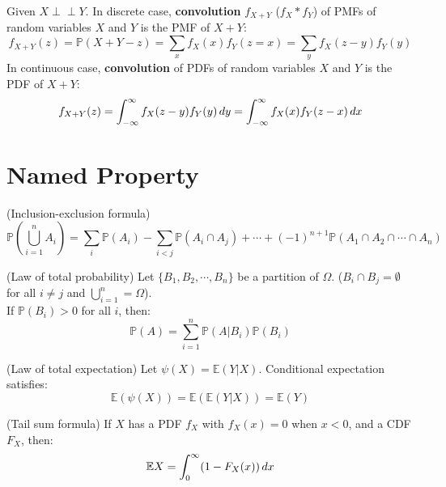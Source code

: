 \documentclass{huhtakm-template-book}
\newcommand{\independent}{\perp\!\!\!\perp}
\newcommand{\prob}{\mathbb{P}}
\newcommand{\expect}{\mathbb{E}}
\begin{document}
    \begin{sdefn}
        Given $X\independent Y$. In discrete case, \textbf{convolution} $f_{X+Y}$ ($f_{X}*f_{Y}$) of PMFs of random variables $X$ and $Y$ is the PMF of $X+Y$:
        \begin{equation*}
            f_{X+Y}(z)=\prob(X+Y-z)=\sum_{x}f_{X}(x)f_{Y}(z=x)=\sum_{y}f_{X}(z-y)f_{Y}(y)
        \end{equation*}
        In continuous case, \textbf{convolution} of PDFs of random variables $X$ and $Y$ is the PDF of $X+Y$:
        \begin{equation*}
            f_{X+Y}(z)=\int_{-\infty}^{\infty} f_{X}(z-y)f_{Y}(y)\,dy=\int_{-\infty}^{\infty} f_{X}(x)f_{Y}(z-x)\,dx
        \end{equation*}
    \end{sdefn}
    
\section*{Named Property}
\begin{spro}(Inclusion-exclusion formula)
    \begin{equation*}
        \prob\left(\bigcup_{i=1}^{n}A_{i}\right)=\sum_{i}\prob(A_{i})-\sum_{i<j}\prob(A_{i}\cap A_{j})+\cdots+(-1)^{n+1}\prob(A_{1}\cap A_{2}\cap\cdots\cap A_{n})
    \end{equation*}
\end{spro}
\begin{spro}(Law of total probability)
    Let $\{B_{1},B_{2},\cdots,B_{n}\}$ be a partition of $\Omega$. ($B_{i}\cap B_{j}=\emptyset$ for all $i\neq j$ and $\bigcup_{i=1}^{n}=\Omega$).\\
    If $\prob(B_{i})>0$ for all $i$, then:
    \begin{equation*}
        \prob(A)=\sum_{i=1}^{n}\prob(A|B_{i})\prob(B_{i})
    \end{equation*}
\end{spro}
\begin{spro}(Law of total expectation)
    Let $\psi(X)=\expect(Y|X)$. Conditional expectation satisfies:
    \begin{equation*}
        \expect(\psi(X))=\expect(\expect(Y|X))=\expect(Y)
    \end{equation*}
\end{spro}
\begin{spro}(Tail sum formula)
    If $X$ has a PDF $f_{X}$ with $f_{X}(x)=0$ when $x<0$, and a CDF $F_{X}$, then:
    \begin{equation*}
        \expect X=\intlu{0}{\infty}(1-F_{X}(x))\,dx
    \end{equation*}
\end{spro}
\end{document}
